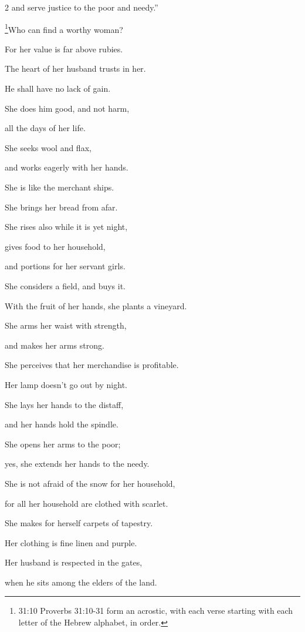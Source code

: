 \begin{multicols}{2}
and serve justice to the poor and needy.”


\vspace{\baselineskip} 
\myverse{}\footnote{31:10 Proverbs 31:10-31 form an acrostic, with each verse starting with
	each letter of the Hebrew alphabet, in order.}Who can find a worthy woman?

For her value is far above rubies.


\myverse{}The heart of her husband trusts in her.

He shall have no lack of gain.


\myverse{}She does him good, and not harm,

all the days of her life.


\myverse{}She seeks wool and flax,

and works eagerly with her hands.


\myverse{}She is like the merchant ships.

She brings her bread from afar.


\myverse{}She rises also while it is yet night,

gives food to her household,

and portions for her servant girls.


\myverse{}She considers a field, and buys it.

With the fruit of her hands, she plants a vineyard.


\myverse{}She arms her waist with strength,

and makes her arms strong.


\myverse{}She perceives that her merchandise is profitable.

Her lamp doesn’t go out by night.


\myverse{}She lays her hands to the distaff,

and her hands hold the spindle.


\myverse{}She opens her arms to the poor;

yes, she extends her hands to the needy.


\myverse{}She is not afraid of the snow for her household,

for all her household are clothed with scarlet.


\myverse{}She makes for herself carpets of tapestry.

Her clothing is fine linen and purple.


\myverse{}Her husband is respected in the gates,

when he sits among the elders of the land.



\end{multicols}
